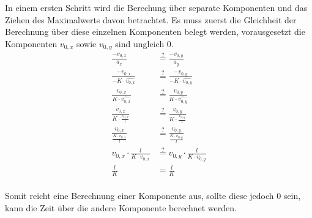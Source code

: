 In einem ersten Schritt wird die Berechung über separate Komponenten und das Ziehen des Maximalwerts davon
betrachtet. Es muss zuerst die Gleichheit der Berechnung über diese einzelnen Komponenten belegt werden, vorausgesetzt
die Komponenten $v_{0,x}$ sowie $v_{0,y}$ sind ungleich $0$.
\begin{align}
    \frac{-v_{0,x}}{a_x} &\stackrel{?}{=} \frac{-v_{0,y}}{a_y}\\
    \frac{-v_{0,x}}{-K \cdot \hat{v_{0,x}}} &\stackrel{?}{=} \frac{-v_{0,y}}{-K \cdot \hat{v_{0,y}}}\\
    \frac{v_{0,x}}{K \cdot \hat{v_{0,x}}} &\stackrel{?}{=} \frac{v_{0,y}}{K \cdot \hat{v_{0,y}}}\\
    \frac{v_{0,x}}{K \cdot \frac{v_{0,x}}{l}} &\stackrel{?}{=} \frac{v_{0,y}}{K \cdot \frac{v_{0,y}}{l}}\\
    \frac{v_{0,x}}{\frac{K \cdot v_{0,x}}{l}} &\stackrel{?}{=} \frac{v_{0,y}}{\frac{K \cdot v_{0,y}}{l}}\\
    v_{0,x} \cdot \frac{l}{K \cdot v_{0,x}} &\stackrel{?}{=} v_{0,y} \cdot \frac{l}{K \cdot v_{0,y}}\\
    \frac{l}{K} &= \frac{l}{K}\\
\end{align}

Somit reicht eine Berechnung einer Komponente aus, sollte diese jedoch $0$ sein, kann die Zeit über die andere
Komponente berechnet werden.

